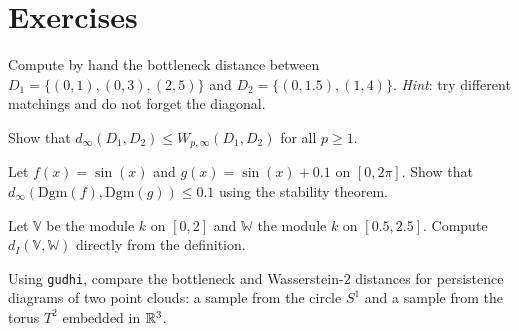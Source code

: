 \section{Exercises}

\begin{exercise}
Compute by hand the bottleneck distance between
$D_1 = \{(0,1), (0,3), (2,5)\}$ and
$D_2 = \{(0,1.5), (1,4)\}$.
\textit{Hint}: try different matchings and do not forget the diagonal.
\end{exercise}

\begin{exercise}
Show that $d_\infty(D_1, D_2) \leq W_{p,\infty}(D_1, D_2)$ for all
$p \geq 1$.
\end{exercise}

\begin{exercise}
Let $f(x) = \sin(x)$ and $g(x) = \sin(x) + 0.1$ on $[0, 2\pi]$.
Show that $d_\infty(\mathrm{Dgm}(f), \mathrm{Dgm}(g)) \leq 0.1$
using the stability theorem.
\end{exercise}

\begin{exercise}
Let $\mathbb{V}$ be the module $k$ on $[0, 2]$ and $\mathbb{W}$ the
module $k$ on $[0.5, 2.5]$. Compute $d_I(\mathbb{V}, \mathbb{W})$
directly from the definition.
\end{exercise}

\begin{exercise}[Implementation]
Using \texttt{gudhi}, compare the bottleneck and Wasserstein-$2$
distances for persistence diagrams of two point clouds: a sample
from the circle $S^1$ and a sample from the torus $T^2$ embedded
in $\mathbb{R}^3$.
\end{exercise}
